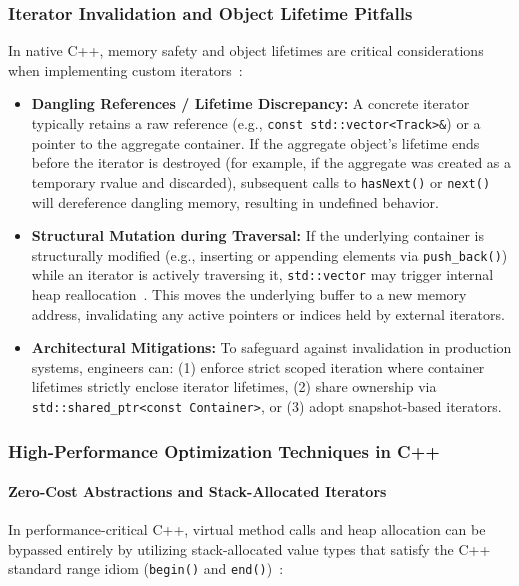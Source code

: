\subsubsection{Iterator Invalidation and Object Lifetime Pitfalls}
In native C++, memory safety and object lifetimes are critical considerations when implementing custom iterators~\cite{stroustrup2013, meyers2014}:
\begin{itemize}
    \item \textbf{Dangling References / Lifetime Discrepancy:} A concrete iterator typically retains a raw reference (e.g., \texttt{const std::vector<Track>\&}) or a pointer to the aggregate container. If the aggregate object's lifetime ends before the iterator is destroyed (for example, if the aggregate was created as a temporary rvalue and discarded), subsequent calls to \texttt{hasNext()} or \texttt{next()} will dereference dangling memory, resulting in undefined behavior.
    \item \textbf{Structural Mutation during Traversal:} If the underlying container is structurally modified (e.g., inserting or appending elements via \texttt{push\_back()}) while an iterator is actively traversing it, \texttt{std::vector} may trigger internal heap reallocation~\cite{stroustrup2013}. This moves the underlying buffer to a new memory address, invalidating any active pointers or indices held by external iterators.
    \item \textbf{Architectural Mitigations:} To safeguard against invalidation in production systems, engineers can: (1) enforce strict scoped iteration where container lifetimes strictly enclose iterator lifetimes, (2) share ownership via \texttt{std::shared\_ptr<const Container>}, or (3) adopt snapshot-based iterators.
\end{itemize}

\subsubsection{High-Performance Optimization Techniques in C++}

\paragraph{Zero-Cost Abstractions and Stack-Allocated Iterators}
In performance-critical C++, virtual method calls and heap allocation can be bypassed entirely by utilizing stack-allocated value types that satisfy the C++ standard range idiom (\texttt{begin()} and \texttt{end()})~\cite{stroustrup2013, meyers2014}:


